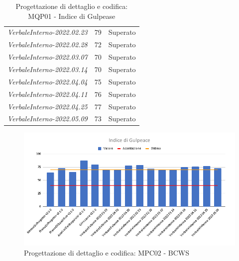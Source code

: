 \begin{table}[H]
\begin{tabular}{m{}<{\centering}  m{}<{\centering}  m{}<{\centering} }
            \textit{VerbaleInterno-2022.02.23} &
            79&
            Superato \\
            \textit{VerbaleInterno-2022.02.28} &
            72&
            Superato \\
            \textit{VerbaleInterno-2022.03.07} &
            70&
            Superato \\
            \textit{VerbaleInterno-2022.03.14} &
            70&
            Superato \\
            \textit{VerbaleInterno-2022.04.04} &
            75&
            Superato \\
            \textit{VerbaleInterno-2022.04.11} &
            76&
            Superato \\
            \textit{VerbaleInterno-2022.04.25} &
            77&
            Superato \\
            \textit{VerbaleInterno-2022.05.09} &
            73&
            Superato \\
    \end{tabular}
    \caption{Progettazione di dettaglio e codifica: MQP01 - Indice di Gulpease}
\end{table}
\begin{figure}[H]
    \centering
    \includegraphics[scale=0.50]{Sezioni/images/pb_prodotto/Indice_di_Gulpeace.png}
    \caption{Progettazione di dettaglio e codifica: MPC02 - BCWS}
\end{figure}

